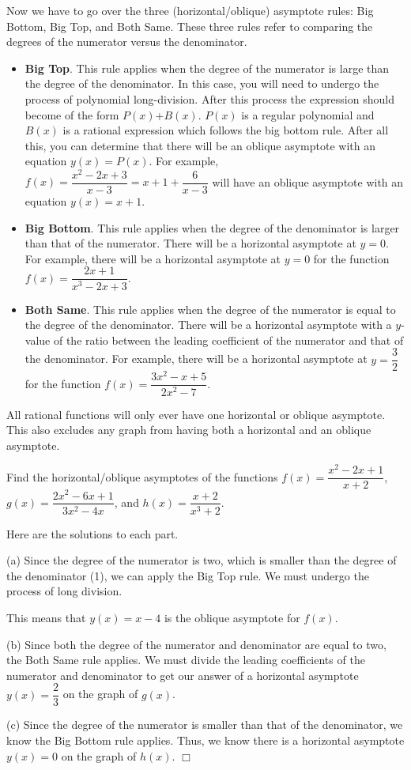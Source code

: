 \documentclass[lang=en,11pt]{elegantbook}
\begin{document}
Now we have to go over the three (horizontal/oblique) asymptote rules: Big Bottom, Big Top, and Both Same. These three rules refer to comparing the degrees of the numerator versus the denominator. 
\begin{itemize}
    \item \textbf{Big Top}. This rule applies when the degree of the numerator is large than the degree of the denominator. In this case, you will need to undergo the process of polynomial long-division. After this process the expression should become of the form $P(x)$+$B(x)$. $P(x)$ is a regular polynomial and $B(x)$ is a rational expression which follows the big bottom rule. After all this, you can determine that there will be an oblique asymptote with an equation $y(x)=P(x)$.  For example, $f(x)=\dfrac{x^2-2x+3}{x-3}=x+1+\dfrac{6}{x-3}$ will have an oblique asymptote with an equation $y(x)=x+1$.
    \item \textbf{Big Bottom}. This rule applies when the degree of the denominator is larger than that of the numerator. There will be a horizontal asymptote at $y=0$. For example, there will be a horizontal asymptote at $y=0$ for the function $f(x)=\dfrac{2x+1}{x^3-2x+3}.$
    \item \textbf{Both Same}. This rule applies when the degree of the numerator is equal to the degree of the denominator. There will be a horizontal asymptote with a $y$-value of the ratio between the leading coefficient of the numerator and that of the denominator. For example, there will be a horizontal asymptote at $y=\dfrac{3}{2}$ for the function $f(x)=\dfrac{3x^2-x+5}{2x^2-7}$.
\end{itemize}
\begin{remark}
All rational functions will only ever have one horizontal or oblique asymptote.  This also excludes any graph from having both a horizontal and an oblique asymptote.
\end{remark}
\begin{example}
Find the horizontal/oblique asymptotes of the functions $f(x)=\dfrac{x^2-2x+1}{x+2}$, $g(x)=\dfrac{2x^2-6x+1}{3x^2-4x}$, and $h(x)=\dfrac{x+2}{x^3+2}$.
\end{example}
\begin{solution}
Here are the solutions to each part.

(a)	Since the degree of the numerator is two, which is smaller than the degree of the denominator (1), we can apply the Big Top rule. We must undergo the process of long division.


This means that $y(x)=x-4$ is the oblique asymptote for $f(x)$.

(b) Since both the degree of the numerator and denominator are equal to two, the Both Same rule applies. We must divide the leading coefficients of the numerator and denominator to get our answer of a horizontal asymptote $y(x)=\dfrac{2}{3}$ on the graph of $g(x)$.

(c) Since the degree of the numerator is smaller than that of the denominator, we know the Big Bottom rule applies. Thus, we know there is a horizontal asymptote $y(x)=0$ on the graph of $h(x)$. $\Box$
\end{solution}
\end{document}

